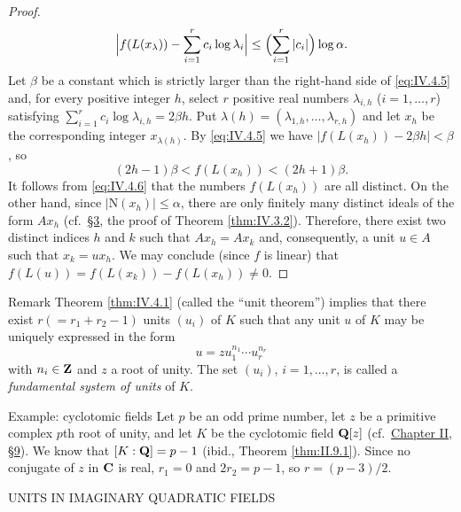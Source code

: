 \begin{proof}
\begin{equation}
\Bigl|f(L(x_{\lambda}))-\sum_{i=1}^{r}c_{i}\log\lambda_{i}\Bigr|
\leq\Bigl(\sum_{i=1}^{r}|c_{i}|\Bigr)\log\alpha.
\label{eq:IV.4.5}
\end{equation}
Let $\beta$ be a constant which is strictly larger than the right-hand side
of \eqref{eq:IV.4.5} and, for every positive integer $h$, select $r$
positive real numbers $\lambda_{i,h}$ ($i=1,\ldots,r$) satisfying
$\sum_{i=1}^{r}c_{i}\log\lambda_{i,h}=2\beta h$. Put
$\lambda(h)=(\lambda_{1,h},\ldots,\lambda_{r,h})$ and let $x_{h}$ be the
corresponding integer $x_{\lambda(h)}$. By \eqref{eq:IV.4.5} we have
$|f(L(x_{h}))-2\beta h|<\beta$, so
\begin{equation}
(2h-1)\beta<f(L(x_{h}))<(2h+1)\beta.
\label{eq:IV.4.6}
\end{equation}
It follows from \eqref{eq:IV.4.6} that the numbers $f(L(x_{h}))$ are all
distinct. On the other hand, since $|\mathrm{N}(x_{h})|\leq\alpha$, there are only
finitely many distinct ideals of the form $Ax_{h}$ (cf.\ \hyperref[sec:4.3]{§3}, the proof of
Theorem \ref{thm:IV.3.2}). Therefore, there exist two distinct indices $h$
and $k$ such that $Ax_{h}=Ax_{k}$ and, consequently, a unit $u\in A$ such
that $x_{k}=ux_{h}$. We may conclude (since $f$ is linear) that
$f(L(u))=f(L(x_{k}))-f(L(x_{h}))\neq0$.
\end{proof}

\begin{statement}{Remark}
\upshape
Theorem \ref{thm:IV.4.1} (called the ``unit theorem'') implies that there
exist $r(=r_{1}+r_{2}-1)$ units $(u_{i})$ of $K$ such that any unit $u$ of
$K$ may be uniquely expressed in the form
\begin{equation}
u=zu_{1}^{n_{1}}\cdots u_{r}^{n_{r}}
\label{eq:IV.4.7}
\end{equation}
with $n_{i}\in\mathbf{Z}$ and $z$ a root of unity. The set $(u_{i})$,
$i=1,\ldots,r$, is called a \emph{fundamental system of units} of $K$.
\end{statement}

\begin{statement}{Example: cyclotomic fields}
\upshape
Let $p$ be an odd prime number, let $z$ be a primitive complex $p$th root of
unity, and let $K$ be the cyclotomic field $\mathbf{Q}[z]$ (cf.\ \hyperref[sec:2.9]{Chapter II, §9}). We
know that $[K:\mathbf{Q}]=p-1$ (ibid., Theorem \ref{thm:II.9.1}). Since no conjugate
of $z$ in $\mathbf{C}$ is real, $r_{1}=0$ and $2r_{2}=p-1$, so $r=(p-3)/2$.
\end{statement}

%
        {UNITS IN IMAGINARY QUADRATIC FIELDS}

